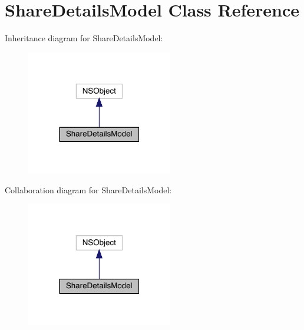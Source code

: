 \hypertarget{interface_share_details_model}{}\section{Share\+Details\+Model Class Reference}
\label{interface_share_details_model}


Inheritance diagram for Share\+Details\+Model\+:\nopagebreak
\begin{figure}[H]
\begin{center}
\leavevmode
\includegraphics[width=180pt]{interface_share_details_model__inherit__graph}
\end{center}
\end{figure}


Collaboration diagram for Share\+Details\+Model\+:\nopagebreak
\begin{figure}[H]
\begin{center}
\leavevmode
\includegraphics[width=180pt]{interface_share_details_model__coll__graph}
\end{center}
\end{figure}
